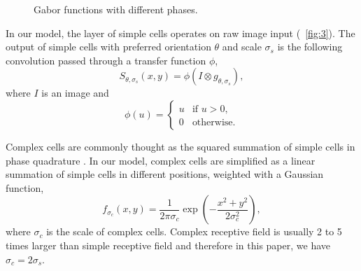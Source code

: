 \documentclass[conference]{IEEEtran}
\begin{document}
\begin{figure}[htp]
\centering
{}\hfil
{}
\caption{Gabor functions with different phases.}
\label{fig:4}
\end{figure}

In our model, the layer of simple cells operates on raw image input
(\figurename~\ref{fig:3}). 
The output of simple cells with preferred orientation $\theta$
and scale $\sigma_s$ is the following convolution
passed through a transfer function $\phi$,
\begin{equation}\label{equ:gabor}
S_{\theta,\sigma_s}(x,y)=\phi(I\otimes g_{\theta,\sigma_s}),
\end{equation}
where $I$ is an image and 
\begin{equation}\label{equ:gabor}
\phi(u)=\left\{\begin{array}{ll}
u & \text{if } u>0,\\
0 & \text{otherwise.}
\end{array}\right.
\end{equation}

Complex cells are commonly thought as the squared summation 
of simple cells in phase quadrature \cite{fleet1996}.
In our model, complex cells are simplified as a linear summation 
of simple cells in different positions, weighted with a Gaussian function,
\begin{equation}
f_{\sigma_c}(x,y)=\frac{1}{2\pi\sigma_c}\exp\left(-\frac{x^2+y^2}{2\sigma_c^2}\right),
\end{equation}
where $\sigma_c$ is the scale of complex cells.
Complex receptive field is usually 2 to 5 times larger than simple receptive field \cite{movshon1978}
and therefore in this paper, we have $\sigma_c=2\sigma_s$.
\end{document}
